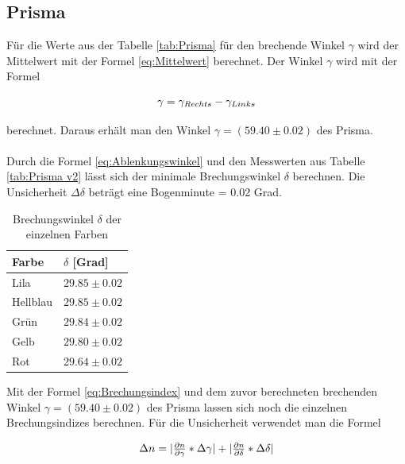 \documentclass[12pt,a4paper,twoside]{article}
\begin{document}
\subsection{Prisma}
Für die Werte aus der Tabelle \ref{tab:Prisma} für den brechende Winkel $\gamma$ wird der Mittelwert mit der Formel \ref{eq:Mittelwert} berechnet. 
Der Winkel $\gamma$ wird mit der Formel

\begin{equation}
    \label{eq:formel für prismawix}
    \centerline{$\gamma = \gamma_{Rechts} - \gamma_{Links}$}
\end{equation}

\noindent
berechnet. Daraus erhält man den Winkel $\gamma = (59.40 \pm 0.02)$ des Prisma. 
\\
\\
Durch die Formel \ref{eq:Ablenkungswinkel} und den Messwerten aus Tabelle \ref{tab:Prisma v2} lässt sich der minimale Brechungswinkel $\delta$ berechnen. 
Die Unsicherheit $\Delta \delta$ beträgt eine Bogenminute = 0.02 Grad. 

\begin{table}[H]
    \centering
    \caption{Brechungswinkel $\delta$ der einzelnen Farben}
    \label{tab:delta scheiß}
    \begin{tabular}{| l | l |}
        \hline
        Farbe & $\delta$ [Grad] \\
        \hline
        Lila        & $ 29.85 \pm 0.02 $ \\
        Hellblau    & $ 29.85 \pm 0.02 $ \\
        Grün        & $ 29.84 \pm 0.02 $ \\
        Gelb        & $ 29.80 \pm 0.02 $ \\
        Rot         & $ 29.64 \pm 0.02 $ \\
        \hline
    \end{tabular}
\end{table}

\noindent
Mit der Formel \ref{eq:Brechungsindex} und dem zuvor berechneten brechenden Winkel $\gamma = (59.40 \pm 0.02)$ des Prisma lassen sich noch die einzelnen Brechungsindizes berechnen. 
Für die Unsicherheit verwendet man die Formel

\begin{equation}
    \label{eq:uns n}
    \centerline{$ \Delta n = \vert \frac{\partial n}{\partial \gamma} * \Delta \gamma \vert + \vert \frac{\partial n }{\partial \delta} * \Delta \delta \vert$}
\end{equation}
\end{document}
